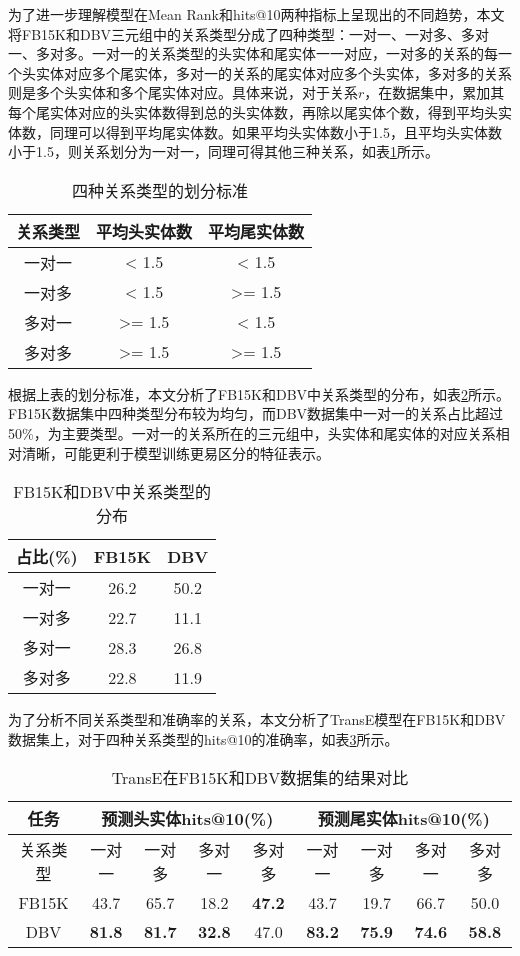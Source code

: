 为了进一步理解模型在Mean Rank和hits@10两种指标上呈现出的不同趋势，本文将FB15K和DBV三元组中的关系类型分成了四种类型：一对一、一对多、多对一、多对多。一对一的关系类型的头实体和尾实体一一对应，一对多的关系的每一个头实体对应多个尾实体，多对一的关系的尾实体对应多个头实体，多对多的关系则是多个头实体和多个尾实体对应。具体来说，对于关系$r$，在数据集中，累加其每个尾实体对应的头实体数得到总的头实体数，再除以尾实体个数，得到平均头实体数，同理可以得到平均尾实体数。如果平均头实体数小于1.5，且平均头实体数小于1.5，则关系划分为一对一，同理可得其他三种关系，如表\ref{rel_type}所示。
\begin{table}[H]
\centering
\caption{四种关系类型的划分标准}
\begin{tabular}{ccc}
\toprule
关系类型 & 平均头实体数 & 平均尾实体数 \\
\midrule
一对一 & < 1.5 & < 1.5 \\
一对多 & < 1.5 & >= 1.5 \\
多对一 & >= 1.5 & < 1.5 \\
多对多 & >= 1.5 & >= 1.5 \\
\bottomrule
\end{tabular}
\label{rel_type}
\end{table}

根据上表的划分标准，本文分析了FB15K和DBV中关系类型的分布，如表\ref{rel_dist}所示。FB15K数据集中四种类型分布较为均匀，而DBV数据集中一对一的关系占比超过50\%，为主要类型。一对一的关系所在的三元组中，头实体和尾实体的对应关系相对清晰，可能更利于模型训练更易区分的特征表示。
\begin{table}[H]
\centering
\caption{FB15K和DBV中关系类型的分布}
\begin{tabular}{ccc}
\toprule
占比(\%) & FB15K & DBV \\
\midrule
一对一 & 26.2 & 50.2 \\
一对多 & 22.7 & 11.1 \\
多对一 & 28.3 & 26.8 \\
多对多 & 22.8 & 11.9 \\
\bottomrule
\end{tabular}
\label{rel_dist}
\end{table}

为了分析不同关系类型和准确率的关系，本文分析了TransE模型在FB15K和DBV数据集上，对于四种关系类型的hits@10的准确率，如表\ref{rel_hits10}所示。
\begin{table}[H]
\centering
\caption{TransE在FB15K和DBV数据集的结果对比}
\begin{tabular}{ccccccccc}
\toprule
任务 & \multicolumn{4}{c}{预测头实体hits@10(\%)} & \multicolumn{4}{c}{预测尾实体hits@10(\%)} \\
\midrule
关系类型 & 一对一 & 一对多 & 多对一 & 多对多 & 一对一 & 一对多 & 多对一 & 多对多\\
\midrule
FB15K & 43.7 & 65.7 & 18.2 & \textbf{47.2} & 43.7 & 19.7 & 66.7 & 50.0\\
DBV   & \textbf{81.8} & \textbf{81.7} & \textbf{32.8} & 47.0 & \textbf{83.2} & \textbf{75.9} & \textbf{74.6} & \textbf{58.8}\\
\bottomrule
\end{tabular}
\label{rel_hits10}
\end{table}

